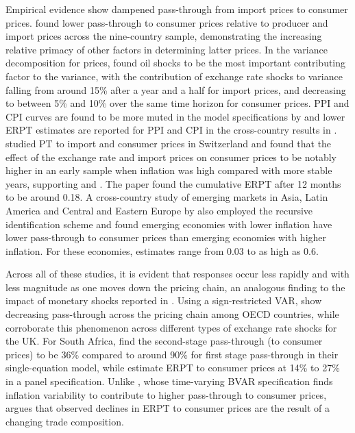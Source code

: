 \documentclass[12pt]{article}
\begin{document}
Empirical evidence show dampened pass-through from import prices to consumer prices. \textcite{mccarthy1999} found lower pass-through to consumer prices relative to producer and import prices across the nine-country sample, demonstrating the increasing relative primacy of other factors in determining latter prices. In the variance decomposition for prices, \textcite{hahn2003} found oil shocks to be the most important contributing factor to the variance, with the contribution of exchange rate shocks to variance falling from around 15\% after a year and a half for import prices, and decreasing to between 5\%  and 10\% over the same time horizon for consumer prices. PPI and CPI curves are found to be more muted in the model specifications by \textcite{choudhri2005explaining} and lower ERPT estimates are reported for PPI and CPI in the cross-country results in \textcite{choudhri2015exchange}. \textcite{stulz2007} studied PT to import and consumer prices in Switzerland and found that the effect of the exchange rate and import prices on consumer prices to be notably higher in an early sample when inflation was high compared with more stable years, supporting \textcite{taylor2000low} and \textcite{gagnon2004monetary}. The paper found the cumulative ERPT after 12 months to be around 0.18. A cross-country study of emerging markets in Asia, Latin America and Central and Eastern Europe by \textcite{cazorzi2007} also employed the recursive identification scheme and found emerging economies with lower inflation have lower pass-through to consumer prices than emerging economies with higher inflation. For these economies, estimates range from 0.03 to as high as 0.6.

Across all of these studies, it is evident that responses occur less rapidly and with less magnitude as one moves down the pricing chain, an analogous finding to the impact of monetary shocks reported in \textcite{clark1999responses}. Using a sign-restricted VAR, \textcite{AnWang2011} show decreasing pass-through across the pricing chain among OECD countries, while \textcite{forbes2018shocks} corroborate this phenomenon across different types of exchange rate shocks for the UK. For South Africa, \textcite{kabundi2016exchange} find the second-stage pass-through (to consumer prices) to be 36\% compared to around 90\% for first stage pass-through in their single-equation model, while \textcite{parsley2012exchange} estimate ERPT to consumer prices at 14\% to 27\% in a panel specification. Unlike \textcite{jooste2014determinants}, whose time-varying BVAR specification finds inflation variability to contribute to higher pass-through to consumer prices, \textcite{parsley2012exchange} argues that observed declines in ERPT to consumer prices are the result of a changing trade composition. 
\end{document}

